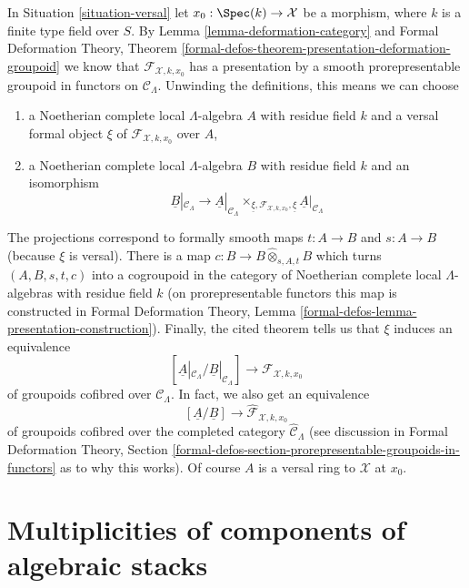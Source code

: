 \begin{remark}
\label{remark-groupoid-defo}
In Situation \ref{situation-versal} let $x_0 : \Spec(k) \to \mathcal{X}$
be a morphism, where $k$ is a finite type field over $S$.
By Lemma \ref{lemma-deformation-category} and
Formal Deformation Theory, Theorem
\ref{formal-defos-theorem-presentation-deformation-groupoid}
we know that $\mathcal{F}_{\mathcal{X}, k, x_0}$ has a
presentation by a smooth prorepresentable groupoid in
functors on $\mathcal{C}_\Lambda$.
Unwinding the definitions, this means we can choose
\begin{enumerate}
\item a Noetherian complete local $\Lambda$-algebra $A$
with residue field $k$ and a versal formal object $\xi$
of $\mathcal{F}_{\mathcal{X}, k, x_0}$ over $A$,
\item a Noetherian complete local $\Lambda$-algebra $B$
with residue field $k$ and an isomorphism
$$
\underline{B}|_{\mathcal{C}_\Lambda}
\longrightarrow
\underline{A}|_{\mathcal{C}_\Lambda}
\times_{\underline{\xi}, \mathcal{F}_{\mathcal{X}, k, x_0}, \underline{\xi}}
\underline{A}|_{\mathcal{C}_\Lambda}
$$
\end{enumerate}
The projections correspond to formally smooth maps
$t : A \to B$ and $s : A \to B$ (because $\xi$ is versal).
There is a map $c : B \to B \widehat{\otimes}_{s, A, t} B$
which turns $(A, B, s, t, c)$ into a cogroupoid in the category
of Noetherian complete local $\Lambda$-algebras with residue field $k$
(on prorepresentable functors this map is constructed in
Formal Deformation Theory, Lemma
\ref{formal-defos-lemma-presentation-construction}).
Finally, the cited theorem tells us that $\xi$ induces
an equivalence
$$
[\underline{A}|_{\mathcal{C}_\Lambda} / \underline{B}|_{\mathcal{C}_\Lambda}]
\longrightarrow
\mathcal{F}_{\mathcal{X}, k, x_0}
$$
of groupoids cofibred over $\mathcal{C}_\Lambda$. In fact, we also
get an equivalence
$$
[\underline{A}/\underline{B}]
\longrightarrow
\widehat{\mathcal{F}}_{\mathcal{X}, k, x_0}
$$
of groupoids cofibred over the completed category
$\widehat{\mathcal{C}}_\Lambda$ (see discussion in
Formal Deformation Theory, Section
\ref{formal-defos-section-prorepresentable-groupoids-in-functors}
as to why this works). Of course $A$ is a versal ring to
$\mathcal{X}$ at $x_0$.
\end{remark}








\section{Multiplicities of components of algebraic stacks}
\label{section-multiplicities}

